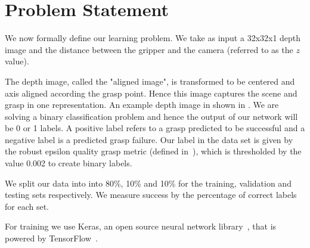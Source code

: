 
\section{Problem Statement}
\label{sec:problem}

We now formally define our learning problem. 
We take as input a 32x32x1 depth image and the distance between the gripper and the camera (referred to as the $z$ value). 

The depth image, called the "aligned image", is transformed to be centered and axis aligned according the grasp point. 
Hence this image captures the scene and grasp in one representation. 
An example depth image in shown in . 
We are solving a binary classification problem and hence the output of our network will be 0 or 1 labels. 
A positive label refers to a grasp predicted to be successful and a negative label is a predicted grasp failure. 
Our label in the data set is given by the robust epsilon quality grasp metric (defined in~\cite{seita2016large}), which is thresholded by the value 0.002 to create binary labels.

We split our data into into 80\%, 10\% and 10\% for the training, validation and testing sets respectively.
We measure success by the percentage of correct labels for each set. 

For training we use Keras, an open source neural network library~\cite{chollet2017keras}, that is powered by TensorFlow~\cite{abadi2016tensorflow}. 